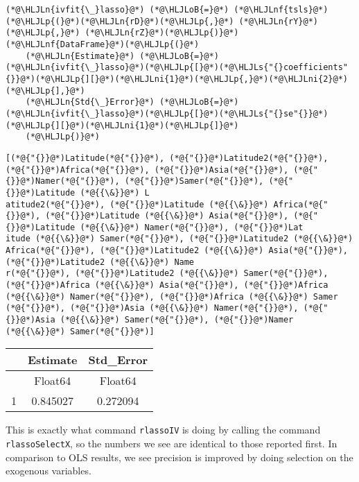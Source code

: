 \documentclass[12pt,a4paper]{article}
\newcommand{\HLJLn}[1]{#1}
\newcommand{\HLJLnf}[1]{\textcolor[RGB]{66,102,213}{#1}}
\newcommand{\HLJLs}[1]{\textcolor[RGB]{201,61,57}{#1}}
\newcommand{\HLJLni}[1]{\textcolor[RGB]{59,151,46}{#1}}
\newcommand{\HLJLoB}[1]{\textcolor[RGB]{102,102,102}{\textbf{#1}}}
\newcommand{\HLJLp}[1]{#1}
\begin{document}
\begin{lstlisting}
(*@\HLJLn{ivfit{\_}lasso}@*) (*@\HLJLoB{=}@*) (*@\HLJLnf{tsls}@*)(*@\HLJLp{(}@*)(*@\HLJLn{rD}@*)(*@\HLJLp{,}@*) (*@\HLJLn{rY}@*)(*@\HLJLp{,}@*) (*@\HLJLn{rZ}@*)(*@\HLJLp{)}@*)
(*@\HLJLnf{DataFrame}@*)(*@\HLJLp{(}@*)
    (*@\HLJLn{Estimate}@*) (*@\HLJLoB{=}@*) (*@\HLJLn{ivfit{\_}lasso}@*)(*@\HLJLp{[}@*)(*@\HLJLs{"{}coefficients"{}}@*)(*@\HLJLp{][}@*)(*@\HLJLni{1}@*)(*@\HLJLp{,}@*)(*@\HLJLni{2}@*)(*@\HLJLp{],}@*) 
    (*@\HLJLn{Std{\_}Error}@*) (*@\HLJLoB{=}@*) (*@\HLJLn{ivfit{\_}lasso}@*)(*@\HLJLp{[}@*)(*@\HLJLs{"{}se"{}}@*)(*@\HLJLp{][}@*)(*@\HLJLni{1}@*)(*@\HLJLp{]}@*)
    (*@\HLJLp{)}@*)
\end{lstlisting}

\begin{lstlisting}
[(*@{"{}}@*)Latitude(*@{"{}}@*), (*@{"{}}@*)Latitude2(*@{"{}}@*), (*@{"{}}@*)Africa(*@{"{}}@*), (*@{"{}}@*)Asia(*@{"{}}@*), (*@{"{}}@*)Namer(*@{"{}}@*), (*@{"{}}@*)Samer(*@{"{}}@*), (*@{"{}}@*)Latitude (*@{{\&}}@*) L
atitude2(*@{"{}}@*), (*@{"{}}@*)Latitude (*@{{\&}}@*) Africa(*@{"{}}@*), (*@{"{}}@*)Latitude (*@{{\&}}@*) Asia(*@{"{}}@*), (*@{"{}}@*)Latitude (*@{{\&}}@*) Namer(*@{"{}}@*), (*@{"{}}@*)Lat
itude (*@{{\&}}@*) Samer(*@{"{}}@*), (*@{"{}}@*)Latitude2 (*@{{\&}}@*) Africa(*@{"{}}@*), (*@{"{}}@*)Latitude2 (*@{{\&}}@*) Asia(*@{"{}}@*), (*@{"{}}@*)Latitude2 (*@{{\&}}@*) Name
r(*@{"{}}@*), (*@{"{}}@*)Latitude2 (*@{{\&}}@*) Samer(*@{"{}}@*), (*@{"{}}@*)Africa (*@{{\&}}@*) Asia(*@{"{}}@*), (*@{"{}}@*)Africa (*@{{\&}}@*) Namer(*@{"{}}@*), (*@{"{}}@*)Africa (*@{{\&}}@*) Samer
(*@{"{}}@*), (*@{"{}}@*)Asia (*@{{\&}}@*) Namer(*@{"{}}@*), (*@{"{}}@*)Asia (*@{{\&}}@*) Samer(*@{"{}}@*), (*@{"{}}@*)Namer (*@{{\&}}@*) Samer(*@{"{}}@*)]
\end{lstlisting}


\begin{tabular}{r|cc}
	& Estimate & Std\_Error\\
	\hline
	& Float64 & Float64\\
	\hline
	1 & 0.845027 & 0.272094 \\
\end{tabular}


This is exactly what command \texttt{rlassoIV} is doing by calling the command \texttt{rlassoSelectX}, so the numbers we see are identical to those reported first. In comparison to OLS results, we see precision is improved by doing selection on the exogenous variables.
\end{document}
